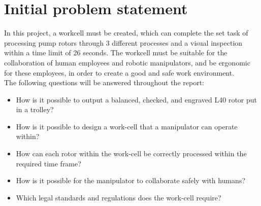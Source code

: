 
\newpage
\section{Initial problem statement}\label{ch:Initial problem statment}


In this project, a workcell must be created, which can complete the set task of processing pump rotors through 3 different processes and a visual inspection within a time limit of 26 seconds. The workcell must be suitable for the collaboration of human employees and robotic manipulators, and be ergonomic for these employees, in order to create a good and safe work environment. \\
The following questions will be answered throughout the report:

\begin{itemize}

    \item How is it possible to output a balanced, checked, and engraved L40 rotor put in a trolley?
    \item How is it possible to design a work-cell that a manipulator can operate within?
    \item How can each rotor within the work-cell be correctly processed within the required time frame?
    \item How is it possible for the manipulator to collaborate safely with humans?
    \item Which legal standards and regulations does the work-cell require?
\end{itemize}


